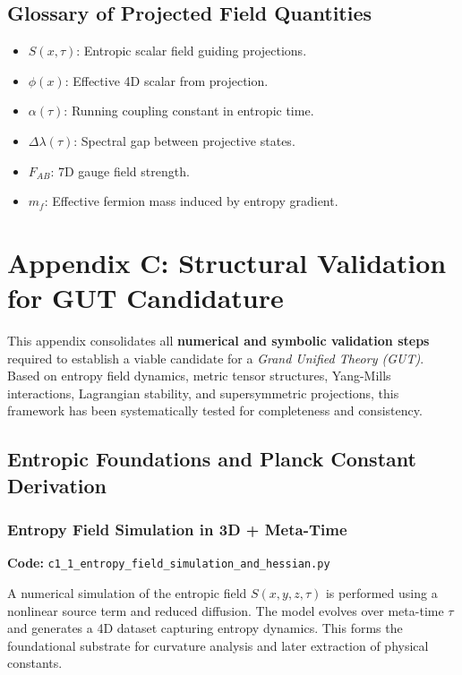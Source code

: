 \documentclass[10.5pt,a4paper]{article}
\begin{document}
\subsection{Glossary of Projected Field Quantities}
\begin{itemize}
    \item \( S(x,\tau) \): Entropic scalar field guiding projections.
    \item \( \phi(x) \): Effective 4D scalar from projection.
    \item \( \alpha(\tau) \): Running coupling constant in entropic time.
    \item \( \Delta\lambda(\tau) \): Spectral gap between projective states.
    \item \( F_{AB} \): 7D gauge field strength.
    \item \( m_f \): Effective fermion mass induced by entropy gradient.
\end{itemize}

\clearpage

\renewcommand{\thesubsection}{C.\arabic{subsection}}

\section{Appendix C: Structural Validation for GUT Candidature}

This appendix consolidates all \textbf{numerical and symbolic validation steps} required to establish a viable candidate for a \emph{Grand Unified Theory (GUT)}. Based on entropy field dynamics, metric tensor structures, Yang-Mills interactions, Lagrangian stability, and supersymmetric projections, this framework has been systematically tested for completeness and consistency.

\subsection{Entropic Foundations and Planck Constant Derivation}

\subsubsection{Entropy Field Simulation in 3D + Meta-Time}

\noindent\textbf{Code:} \texttt{c1\_1\_entropy\_field\_simulation\_and\_hessian.py}

A numerical simulation of the entropic field \( S(x, y, z, \tau) \) is performed using a nonlinear source term and reduced diffusion. The model evolves over meta-time \( \tau \) and generates a 4D dataset capturing entropy dynamics. This forms the foundational substrate for curvature analysis and later extraction of physical constants.
\end{document}
